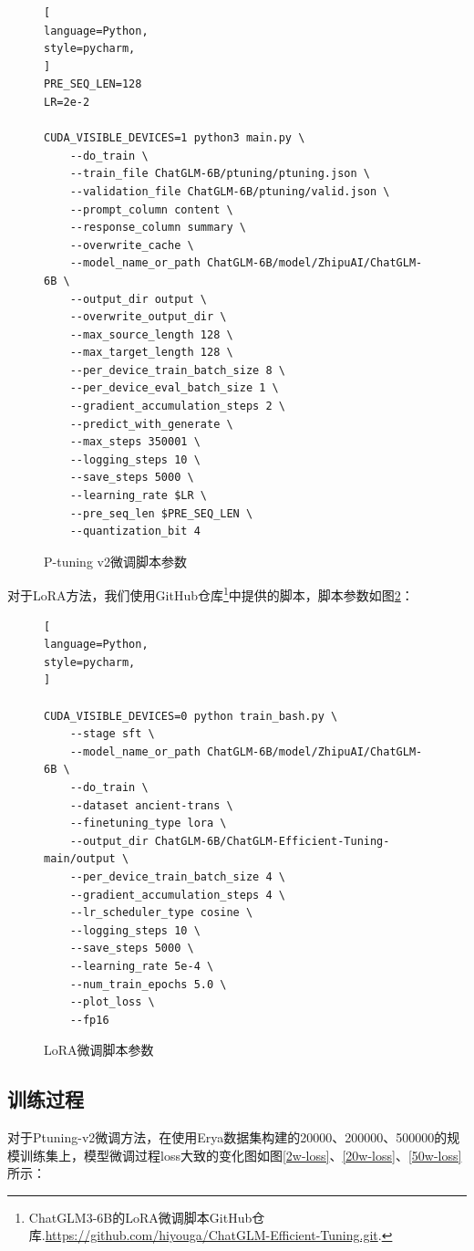 \documentclass[
    decl-page,  %
    ,fontset = win, %
  ]{njuthesis}
\begin{document}
\begin{figure}[h]
    \centering
    {\linespread{1.0}
\begin{lstlisting}[   
language=Python, 
style=pycharm,
]
PRE_SEQ_LEN=128
LR=2e-2

CUDA_VISIBLE_DEVICES=1 python3 main.py \
    --do_train \
    --train_file ChatGLM-6B/ptuning/ptuning.json \
    --validation_file ChatGLM-6B/ptuning/valid.json \
    --prompt_column content \
    --response_column summary \
    --overwrite_cache \
    --model_name_or_path ChatGLM-6B/model/ZhipuAI/ChatGLM-6B \
    --output_dir output \
    --overwrite_output_dir \
    --max_source_length 128 \
    --max_target_length 128 \
    --per_device_train_batch_size 8 \
    --per_device_eval_batch_size 1 \
    --gradient_accumulation_steps 2 \
    --predict_with_generate \
    --max_steps 350001 \
    --logging_steps 10 \
    --save_steps 5000 \
    --learning_rate $LR \
    --pre_seq_len $PRE_SEQ_LEN \
    --quantization_bit 4
\end{lstlisting}
}
    \caption{P-tuning v2微调脚本参数}
    \label{canshu1}
\end{figure}

对于LoRA方法，我们使用GitHub仓库\footnote{ChatGLM3-6B的LoRA微调脚本GitHub仓库.\url{https://github.com/hiyouga/ChatGLM-Efficient-Tuning.git}.}中提供的脚本，脚本参数如图\ref{canshu2}：

\begin{figure}
    \centering
    {\linespread{1.0}
\begin{lstlisting}[   
language=Python, 
style=pycharm,
]

CUDA_VISIBLE_DEVICES=0 python train_bash.py \
    --stage sft \
    --model_name_or_path ChatGLM-6B/model/ZhipuAI/ChatGLM-6B \
    --do_train \
    --dataset ancient-trans \
    --finetuning_type lora \
    --output_dir ChatGLM-6B/ChatGLM-Efficient-Tuning-main/output \
    --per_device_train_batch_size 4 \
    --gradient_accumulation_steps 4 \
    --lr_scheduler_type cosine \
    --logging_steps 10 \
    --save_steps 5000 \
    --learning_rate 5e-4 \
    --num_train_epochs 5.0 \
    --plot_loss \
    --fp16
\end{lstlisting}
}
    \caption{LoRA微调脚本参数}
    \label{canshu2}
\end{figure}

\subsection{训练过程}
对于Ptuning-v2微调方法，在使用Erya数据集构建的20000、200000、500000的规模训练集上，模型微调过程loss大致的变化图如图\ref{2w-loss}、\ref{20w-loss}、\ref{50w-loss}所示：
\end{document}
